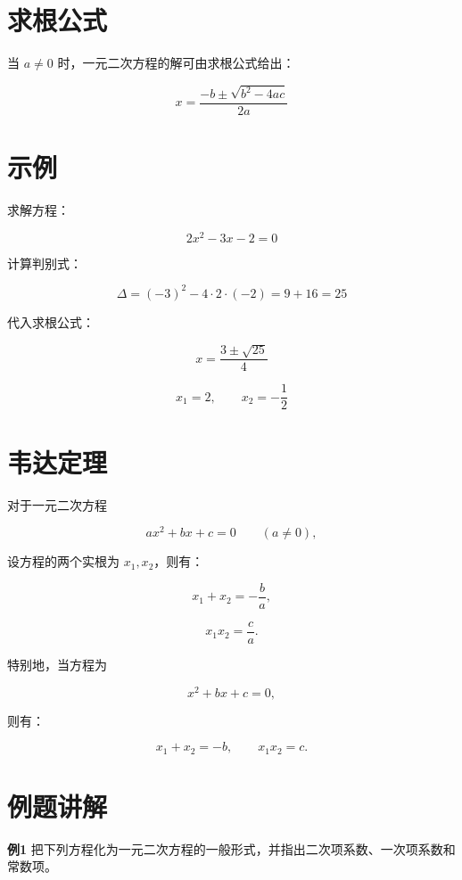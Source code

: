\documentclass[12pt]{article}
\begin{document}
\section{求根公式}

当 \(a \neq 0\) 时，一元二次方程的解可由求根公式给出：


\[
  x = \frac{-b \pm \sqrt{b^2 - 4ac}}{2a}
\]



\section{示例}

求解方程：


\[
  2x^2 - 3x - 2 = 0
\]



计算判别式：


\[
  \Delta = (-3)^2 - 4 \cdot 2 \cdot (-2) = 9 + 16 = 25
\]



代入求根公式：


\[
  x = \frac{3 \pm \sqrt{25}}{4}
\]




\[
  x_1 = 2,\qquad x_2 = -\frac{1}{2}
\]

\section{韦达定理}

对于一元二次方程


\[
  ax^2 + bx + c = 0 \qquad (a \neq 0),
\]


设方程的两个实根为 \(x_1, x_2\)，则有：



\[
  x_1 + x_2 = -\frac{b}{a},
\]




\[
  x_1 x_2 = \frac{c}{a}.
\]



特别地，当方程为


\[
  x^2 + bx + c = 0,
\]


则有：


\[
  x_1 + x_2 = -b,\qquad x_1 x_2 = c.
\]



\section*{例题讲解}

\textbf{例1} 把下列方程化为一元二次方程的一般形式，并指出二次项系数、一次项系数和常数项。
\end{document}

